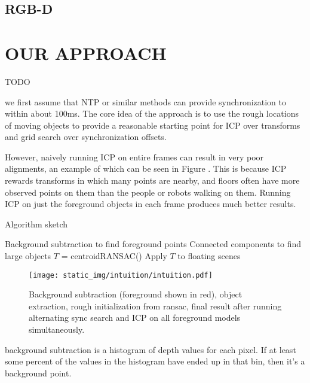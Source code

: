 \documentclass[letterpaper, 10 pt, conference]{ieeeconf}  %
\begin{document}
\subsection{RGB-D}


\section{OUR APPROACH}
TODO




 we first assume that NTP or similar methods can provide synchronization to within about 100ms.  The core idea of the approach is to use the rough locations of moving objects to provide a reasonable starting point for ICP over transforms and grid search over synchronization offsets.

However, naively running ICP on entire frames can result in very poor alignments, an example of which can be seen in Figure .  This is because ICP rewards transforms in which many points are nearby, and floors often have more observed points on them than the people or robots walking on them.  Running ICP on just the foreground objects in each frame produces much better results.


\begin{algorithm}
  \caption{Algorithm sketch}
  \label{alg:sketch}
  \SetLine
  \phantom{\;}
  Background subtraction to find foreground points\;
  Connected components to find large objects\;
  $T$ = centroidRANSAC()\;
  Apply $T$ to floating scenes\;
\end{algorithm}

\begin{figure*}
  \centering
  \texttt{[image: static\_img/intuition/intuition.pdf]}
  \caption{Background subtraction (foreground shown in red), object extraction, rough initialization from ransac, final result after running alternating sync search and ICP on all foreground models simultaneously. }
  \label{fig:}
\end{figure*}


background subtraction is a histogram of depth values for each pixel.  If at least some percent of the values in the histogram have ended up in that bin, then it's a background point.
\end{document}
